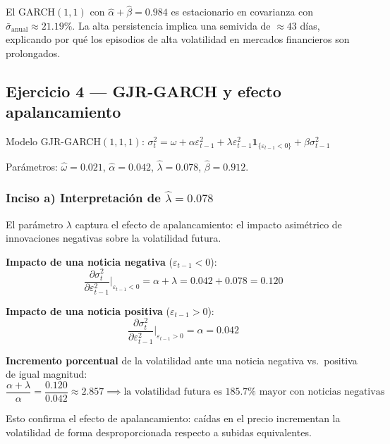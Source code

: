 \documentclass[12pt,a4paper]{article}
\begin{document}
\begin{hallazgo}
El GARCH$(1,1)$ con $\hat{\alpha}+\hat{\beta}=0.984$ es estacionario en covarianza con $\bar{\sigma}_{\text{anual}}\approx21.19\%$. La alta persistencia implica una semivida de $\approx43$ días, explicando por qué los episodios de alta volatilidad en mercados financieros son prolongados.
\end{hallazgo}

\subsection{Ejercicio 4 — GJR-GARCH y efecto apalancamiento}

Modelo GJR-GARCH$(1,1,1)$:
$\sigma_t^2 = \omega + \alpha\varepsilon_{t-1}^2 + \lambda\varepsilon_{t-1}^2\mathbf{1}_{\{\varepsilon_{t-1}<0\}} + \beta\sigma_{t-1}^2$

Parámetros: $\hat{\omega}=0.021$, $\hat{\alpha}=0.042$, $\hat{\lambda}=0.078$, $\hat{\beta}=0.912$.

\subsubsection*{Inciso a) Interpretación de $\hat{\lambda}=0.078$}

\begin{solucion}
El parámetro $\lambda$ captura el efecto de apalancamiento: el impacto asimétrico de innovaciones negativas sobre la volatilidad futura.

\textbf{Impacto de una noticia negativa} ($\varepsilon_{t-1}<0$):
\begin{equation}
\frac{\partial\sigma_t^2}{\partial\varepsilon_{t-1}^2}\bigg|_{\varepsilon_{t-1}<0} = \alpha + \lambda = 0.042 + 0.078 = 0.120
\end{equation}

\textbf{Impacto de una noticia positiva} ($\varepsilon_{t-1}>0$):
\begin{equation}
\frac{\partial\sigma_t^2}{\partial\varepsilon_{t-1}^2}\bigg|_{\varepsilon_{t-1}>0} = \alpha = 0.042
\end{equation}

\textbf{Incremento porcentual} de la volatilidad ante una noticia negativa vs.\ positiva de igual magnitud:
\begin{equation}
\frac{\alpha+\lambda}{\alpha} = \frac{0.120}{0.042} \approx 2.857 \implies \text{la volatilidad futura es } \mathbf{185.7\%} \text{ mayor con noticias negativas}
\end{equation}

Esto confirma el efecto de apalancamiento: caídas en el precio incrementan la volatilidad de forma desproporcionada respecto a subidas equivalentes.
\end{solucion}
\end{document}
